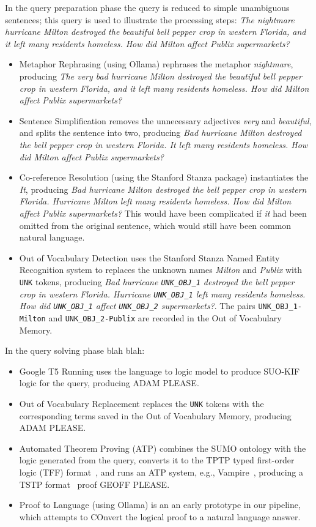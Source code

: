 \documentclass[runningheads]{llncs}
\begin{document}
In the query preparation phase the query is reduced to simple unambiguous sentences; this query 
is used to illustrate the processing steps:
\emph{The nightmare hurricane Milton destroyed the beautiful bell pepper crop in western Florida, 
and it left many residents homeless. How did Milton affect Publix supermarkets?}
\begin{itemize}
\item Metaphor Rephrasing (using Ollama) rephrases the metaphor \emph{nightmare}, producing 
      \emph{The very bad hurricane Milton destroyed the beautiful bell pepper crop in western 
      Florida, and it left many residents homeless. How did Milton affect Publix supermarkets?}
\item Sentence Simplification removes the unnecessary adjectives \emph{very} and \emph{beautiful}, 
      and splits the sentence into two, producing \emph{Bad hurricane Milton destroyed the bell 
      pepper crop in western Florida. It left many residents homeless. How did Milton affect 
      Publix supermarkets?}
\item Co-reference Resolution (using the Stanford Stanza package) instantiates the \emph{It}, 
      producing \emph{Bad hurricane Milton destroyed the bell pepper crop in western Florida. 
      Hurricane Milton left many residents homeless. How did Milton affect Publix supermarkets?}
      This would have been complicated if \emph{it} had been omitted from the original sentence,
      which would still have been common natural language.
\item Out of Vocabulary Detection uses the Stanford Stanza Named Entity Recognition system to
      replaces the unknown names \emph{Milton} and \emph{Publix} with \texttt{UNK} tokens, 
      producing \emph{Bad hurricane \texttt{UNK\_OBJ\_1} destroyed the bell pepper crop in 
      western Florida. Hurricane \texttt{UNK\_OBJ\_1} left many residents homeless.
      How did \texttt{UNK\_OBJ\_1} affect \texttt{UNK\_OBJ\_2} supermarkets?}.
      The pairs \texttt{UNK\_OBJ\_1-Milton} and \texttt{UNK\_OBJ\_2-Publix} are recorded in the 
      Out of Vocabulary Memory.
\end{itemize}

In the query solving phase blah blah:
\begin{itemize}
\item Google T5 Running uses the language to logic model to produce SUO-KIF logic for the query,
      producing ADAM PLEASE.
\item Out of Vocabulary Replacement replaces the \texttt{UNK} tokens with the corresponding terms
      saved in the Out of Vocabulary Memory, producing ADAM PLEASE.
\item Automated Theorem Proving (ATP) combines the SUMO ontology with the logic generated from the
      query, converts it to the TPTP typed first-order logic (TFF) format~\cite{Sut23-IGPL},
      and runs an ATP system, e.g., Vampire~\cite{KV13}, producing a TSTP format~\cite{SZS04} 
      proof GEOFF PLEASE.
\item Proof to Language (using Ollama) is an an early prototype in our pipeline, which attempts 
      to COnvert the logical proof to a natural language answer.
\end{itemize}
\end{document}
